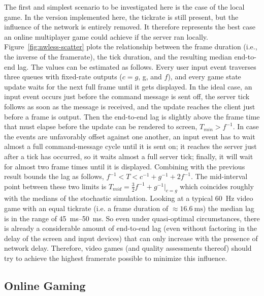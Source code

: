 The first and simplest scenario to be investigated here is the case of the local game. In the version implemented here, the tickrate is still present, but the influence of the network is entirely removed. It therefore represents the best case an online multiplayer game could achieve if the server ran locally. Figure~\ref{fig:nwless-scatter} plots the relationship between the frame duration (i.e., the inverse of the framerate), the tick duration, and the resulting median end-to-end lag. The values can be estimated as follows. Every user input event traverses three queues with fixed-rate outputs ($c=g$, g, and $f$), and every game state update waits for the next full frame until it gets displayed. In the ideal case, an input event occurs just before the command message is sent off, the server tick follows as soon as the message is received, and the update reaches the client just before a frame is output. Then the end-to-end lag is slightly above the frame time that must elapse before the update can be rendered to screen, $T_{min}>f^{-1}$. In case the events are unfavorably offset against one another, an input event has to wait almost a full command-message cycle until it is sent on; it reaches the server just after a tick has occurred, so it waits almost a full server tick; finally, it will wait for almost two frame times until it is displayed. Combining with the previous result bounds the lag as follows, $f^{-1} < T < c^{-1}+g^{-1}+2f^{-1}$. The mid-interval point between these two limits is $T_{mid}=\frac{3}{2} f^{-1} + g^{-1}|_{c=g}$ which coincides roughly with the medians of the stochastic simulation. Looking at a typical \SI{60}{\hertz} video game with an equal tickrate (i.e. a frame duration of $\approx \SI{16.6}{\milli\second}$) the median lag is in the range of \SIrange{45}{50}{\milli\second}. So even under quasi-optimal circumstances, there is already a considerable amount of end-to-end lag (even without factoring in the delay of the screen and input devices) that can only increase with the presence of network delay. Therefore, video games (and quality assessments thereof) should try to achieve the highest framerate possible to minimize this influence.

\subsection{Online Gaming}


